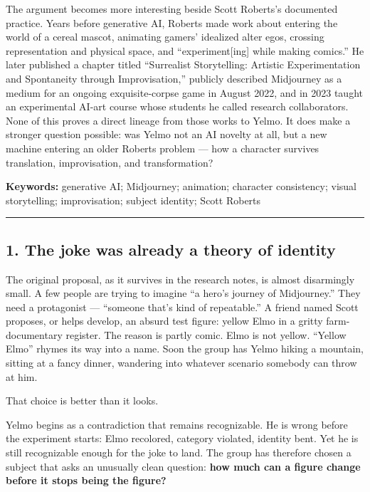 \documentclass[
]{article}
\begin{document}
The argument becomes more interesting beside Scott Roberts's documented
practice. Years before generative AI, Roberts made work about entering
the world of a cereal mascot, animating gamers' idealized alter egos,
crossing representation and physical space, and ``experiment{[}ing{]}
while making comics.'' He later published a chapter titled ``Surrealist
Storytelling: Artistic Experimentation and Spontaneity through
Improvisation,'' publicly described Midjourney as a medium for an
ongoing exquisite-corpse game in August 2022, and in 2023 taught an
experimental AI-art course whose students he called research
collaborators. None of this proves a direct lineage from those works to
Yelmo. It does make a stronger question possible: was Yelmo not an AI
novelty at all, but a new machine entering an older Roberts problem ---
how a character survives translation, improvisation, and transformation?

\textbf{Keywords:} generative AI; Midjourney; animation; character
consistency; visual storytelling; improvisation; subject identity; Scott
Roberts

\begin{center}\rule{0.5\linewidth}{0.5pt}\end{center}

\subsection{1. The joke was already a theory of
identity}\label{the-joke-was-already-a-theory-of-identity}

The original proposal, as it survives in the research notes, is almost
disarmingly small. A few people are trying to imagine ``a hero's journey
of Midjourney.'' They need a protagonist --- ``someone that's kind of
repeatable.'' A friend named Scott proposes, or helps develop, an absurd
test figure: yellow Elmo in a gritty farm-documentary register. The
reason is partly comic. Elmo is not yellow. ``Yellow Elmo'' rhymes its
way into a name. Soon the group has Yelmo hiking a mountain, sitting at
a fancy dinner, wandering into whatever scenario somebody can throw at
him.

That choice is better than it looks.

Yelmo begins as a contradiction that remains recognizable. He is wrong
before the experiment starts: Elmo recolored, category violated,
identity bent. Yet he is still recognizable enough for the joke to land.
The group has therefore chosen a subject that asks an unusually clean
question: \textbf{how much can a figure change before it stops being the
figure?}
\end{document}

